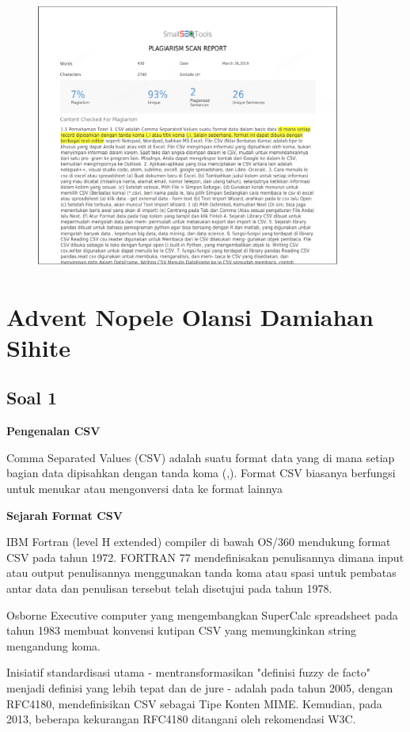 \begin{figure}[H]
 \includegraphics[width=10cm]{figures/4/1174084/Teori/c4_1.png}
 \centering
\end{figure}

\section{Advent Nopele Olansi Damiahan Sihite}
\subsection{Soal 1}
\textbf{Pengenalan CSV}

Comma Separated Values (CSV) adalah suatu format data yang di mana setiap bagian data dipisahkan dengan tanda koma (,). Format CSV biasanya berfungsi untuk menukar atau mengonversi data ke format lainnya 

\textbf{Sejarah Format CSV}

IBM Fortran (level H extended) compiler di bawah OS/360 mendukung format CSV pada tahun 1972. FORTRAN 77 mendefinisakan penulisannya dimana input atau output penulisannya menggunakan tanda koma atau spasi untuk pembatas antar data dan penulisan tersebut telah disetujui pada tahun 1978.

Osborne Executive computer yang mengembangkan SuperCalc spreadsheet pada tahun 1983 membuat konvensi kutipan CSV yang memungkinkan string mengandung koma.

Inisiatif standardisasi utama - mentransformasikan "definisi fuzzy de facto" menjadi definisi yang lebih tepat dan de jure - adalah pada tahun 2005, dengan RFC4180, mendefinisikan CSV sebagai Tipe Konten MIME. Kemudian, pada 2013, beberapa kekurangan RFC4180 ditangani oleh rekomendasi W3C.

